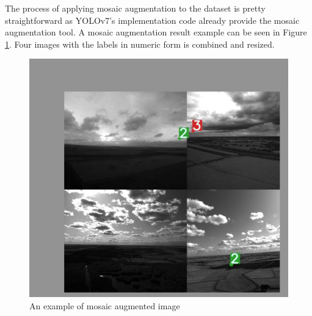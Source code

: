 The process of applying mosaic augmentation to the dataset is pretty straightforward as YOLOv7's implementation code
already provide the mosaic augmentation tool. A mosaic augmentation result example can be seen in Figure \ref{fig:mosaic-train}.
Four images with the labels in numeric form is combined and resized.
  \begin{figure}
    \centering
    \includegraphics[scale=0.4]{figures/mosaic-aug-2.png}
    \caption{An example of mosaic augmented image}
    \label{fig:mosaic-train}
  \end{figure}

